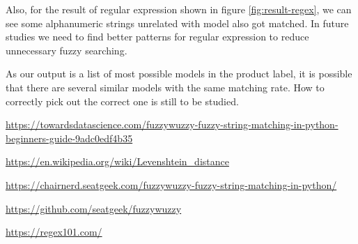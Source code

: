 \documentclass[technicalreport]{ieicej}
\begin{document}
    Also, for the result of regular expression shown in figure \ref{fig:result-regex}, we can see some alphanumeric strings unrelated with model also got matched. In future studies we need to find better patterns for regular expression to reduce unnecessary fuzzy searching.

    As our output is a list of most possible models in the product label, it is possible that there are several similar models with the same matching rate. How to correctly pick out the correct one is still to be studied.
    

%
%
\begin{thebibliography}{99}%
    \url{https://towardsdatascience.com/fuzzywuzzy-fuzzy-string-matching-in-python-beginners-guide-9adc0edf4b35}
    
    \url{https://en.wikipedia.org/wiki/Levenshtein_distance}



    \url{https://chairnerd.seatgeek.com/fuzzywuzzy-fuzzy-string-matching-in-python/}

    \url{https://github.com/seatgeek/fuzzywuzzy}


    \url{https://regex101.com/}


    
    
    
    
    

\end{thebibliography}
\end{document}
